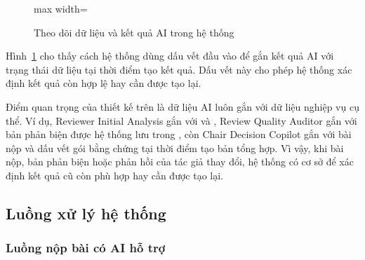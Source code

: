 \begin{figure}[H]
  \centering
  \begin{adjustbox}{max width=\textwidth}
  \end{adjustbox}
  \caption{Theo dõi dữ liệu và kết quả AI trong hệ thống}
  \label{fig:ch3-19}
\end{figure}

Hình~\ref{fig:ch3-19} cho thấy cách hệ thống dùng dấu vết đầu vào để gắn kết quả AI với trạng thái dữ liệu tại thời điểm tạo kết quả. Dấu vết này cho phép hệ thống xác định kết quả còn hợp lệ hay cần được tạo lại.

Điểm quan trọng của thiết kế trên là dữ liệu AI luôn gắn với dữ liệu nghiệp vụ cụ thể. Ví dụ, Reviewer Initial Analysis gắn với  và , Review Quality Auditor gắn với bản phản biện được hệ thống lưu trong , còn Chair Decision Copilot gắn với bài nộp và dấu vết gói bằng chứng tại thời điểm tạo bản tổng hợp. Vì vậy, khi bài nộp, bản phản biện hoặc phản hồi của tác giả thay đổi, hệ thống có cơ sở để xác định kết quả cũ còn phù hợp hay cần được tạo lại.

\subsection{Luồng xử lý hệ thống}

\subsubsection{Luồng nộp bài có AI hỗ trợ}

